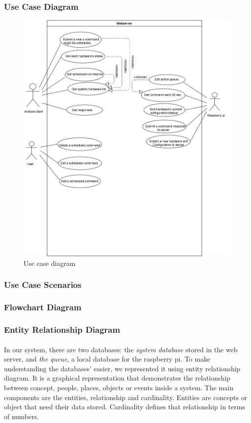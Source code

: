 \documentclass[12pt, oneside, a4paper]{book}
\begin{document}
				\subsubsection{Use Case Diagram}
					\begin{figure}[H]
					\caption{Use case diagram}
					\includegraphics[width=\linewidth]{img/diagram_usecase.jpg}
					\end{figure}
				
				\newpage\subsubsection{Use Case Scenarios}
				\newpage\subsubsection{Flowchart Diagram}
				\newpage\subsubsection{Entity Relationship Diagram}
					\paragraph{} In our system, there are two databases: the \textit{system database} stored in the web server, and \textit{the queue}, a local database for the raspberry pi. To make understanding the databases' easier, we represented it using entity relationship diagram. It is a graphical representation that demonstrates the relationship between concept, people, places, objects or events inside a system. The main components are the entities, relationship and cardinality. Entities are concepts or object that need their data stored. Cardinality defines that relationship in terms of numbers\cite{erd}.
				
\end{document}
